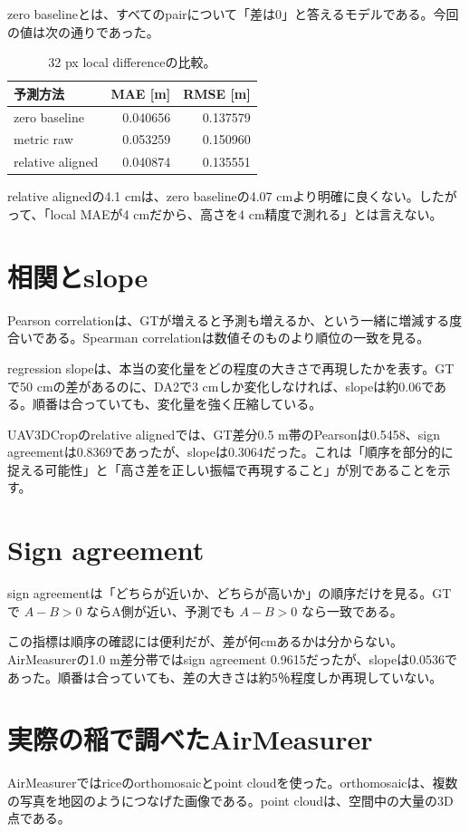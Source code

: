 \documentclass[a4paper,11pt]{ltjsarticle}
\begin{document}
zero baselineとは、すべてのpairについて「差は0」と答えるモデルである。今回の値は次の通りであった。
\begin{table}[H]\centering
\caption{32 px local differenceの比較。}
\begin{tabular}{lrr}\toprule
予測方法 & MAE [m] & RMSE [m]\\\midrule
zero baseline & 0.040656 & 0.137579\\
metric raw & 0.053259 & 0.150960\\
relative aligned & 0.040874 & 0.135551\\\bottomrule
\end{tabular}\end{table}

relative alignedの4.1 cmは、zero baselineの4.07 cmより明確に良くない。したがって、「local MAEが4 cmだから、高さを4 cm精度で測れる」とは言えない。

\section{相関とslope}
Pearson correlationは、GTが増えると予測も増えるか、という一緒に増減する度合いである。Spearman correlationは数値そのものより順位の一致を見る。

regression slopeは、本当の変化量をどの程度の大きさで再現したかを表す。GTで50 cmの差があるのに、DA2で3 cmしか変化しなければ、slopeは約0.06である。順番は合っていても、変化量を強く圧縮している。

UAV3DCropのrelative alignedでは、GT差分0.5 m帯のPearsonは0.5458、sign agreementは0.8369であったが、slopeは0.3064だった。これは「順序を部分的に捉える可能性」と「高さ差を正しい振幅で再現すること」が別であることを示す。

\section{Sign agreement}
sign agreementは「どちらが近いか、どちらが高いか」の順序だけを見る。GTで $A-B>0$ ならA側が近い、予測でも $A-B>0$ なら一致である。

この指標は順序の確認には便利だが、差が何cmあるかは分からない。AirMeasurerの1.0 m差分帯ではsign agreement 0.9615だったが、slopeは0.0536であった。順番は合っていても、差の大きさは約5％程度しか再現していない。

\section{実際の稲で調べたAirMeasurer}
AirMeasurerではriceのorthomosaicとpoint cloudを使った。orthomosaicは、複数の写真を地図のようにつなげた画像である。point cloudは、空間中の大量の3D点である。
\end{document}
